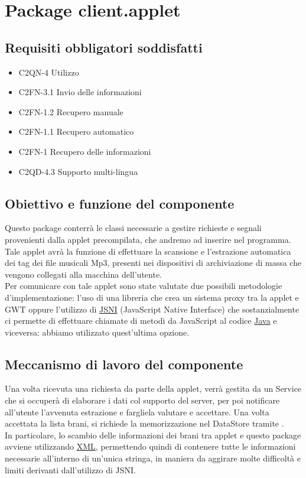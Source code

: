 \newpage

\section{Package client.applet} %
\subsection*{Requisiti obbligatori soddisfatti}
\begin{itemize}
	\item C2QN-4 Utilizzo
	\item C2FN-3.1 Invio delle informazioni
	\item C2FN-1.2 Recupero manuale
	\item C2FN-1.1 Recupero automatico
	\item C2FN-1 Recupero delle informazioni
	\item C2QD-4.3 Supporto multi-lingua
\end{itemize}
\subsection*{Obiettivo e funzione del componente}
Questo package conterr\`a le classi necessarie a gestire richieste e segnali
provenienti dalla applet precompilata, che andremo ad inserire nel programma.
Tale applet avr\`a la funzione di effettuare la scansione e l'estrazione
automatica dei tag dei file musicali Mp3, presenti nei dispositivi di
archiviazione di massa che vengono collegati alla macchina dell'utente.\\
Per comunicare con tale applet sono state valutate due possibili metodologie
d'implementazione: l'uso di una libreria che crea un sistema proxy tra la applet
e GWT oppure l'utilizzo di \underline{JSNI} (JavaScript Native Interface) che
sostanzialmente ci permette di effettuare chiamate di metodi da JavaScript al
codice \underline{Java} e viceversa: abbiamo utilizzato quest'ultima opzione.

\subsection*{Meccanismo di lavoro del componente}
Una volta ricevuta una richiesta da parte della applet, verr\`a gestita da un
Service che si occuper\`a di elaborare i dati col supporto del server, per poi
notificare all'utente l'avvenuta estrazione e fargliela valutare e accettare.
Una volta accettata la lista brani, si richiede la memorizzazione nel DataStore
tramite .\\
In particolare, lo scambio delle informazioni dei brani tra applet e questo
package avviene utilizzando \underline{XML}, permettendo quindi di contenere
tutte le informazioni necessarie all'interno di un'unica stringa, in maniera da
aggirare molte difficolt\`a e limiti derivanti dall'utilizzo di JSNI.

